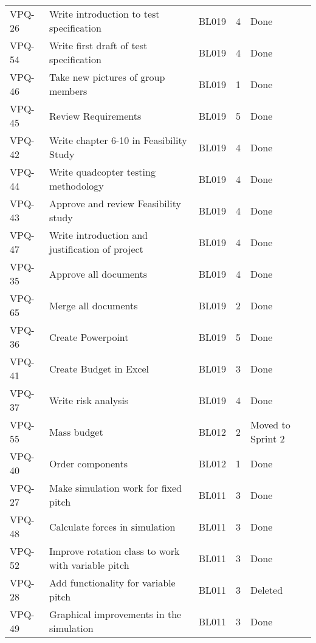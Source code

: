 \begin{table}[ht]
\begin{tabularx}{\linewidth}{|m{1.5cm} m{6.65cm} m{1.2cm} m{1.5cm} m{3.5cm}|}
              VPQ-26 & Write introduction to test specification & BL019  & 4\centering & Done  \\
\rowcolor{gainsboro}VPQ-54 & Write first draft of test specification & BL019 & 4\centering & Done  \\
            VPQ-46 & Take new pictures of group members & BL019 & 1\centering & Done  \\
\rowcolor{gainsboro} VPQ-45 & Review Requirements & BL019 & 5\centering & Done  \\
              VPQ-42 & Write chapter 6-10 in Feasibility Study & BL019 & 4\centering & Done  \\
\rowcolor{gainsboro} VPQ-44 & Write quadcopter testing methodology & BL019 & 4\centering & Done  \\    
            VPQ-43 & Approve and review Feasibility study & BL019 & 4\centering & Done  \\
\rowcolor{gainsboro}  VPQ-47 & Write introduction and justification of project & BL019 & 4\centering & Done  \\
            VPQ-35 & Approve all documents & BL019 & 4\centering & Done  \\
\rowcolor{gainsboro}  VPQ-65 & Merge all documents & BL019 & 2\centering & Done \\
            VPQ-36 & Create Powerpoint & BL019 & 5\centering & Done  \\
\rowcolor{gainsboro}  VPQ-41 & Create Budget in Excel & BL019 & 3\centering & Done  \\
            VPQ-37 & Write risk analysis & BL019 & 4\centering & Done  \\
\rowcolor{gainsboro}  VPQ-55 & Mass budget & BL012 & 2\centering & Moved to Sprint 2  \\
            VPQ-40 & Order components & BL012 & 1\centering & Done  \\
\rowcolor{gainsboro}  VPQ-27 & Make simulation work for fixed pitch & BL011 & 3\centering & Done  \\
            VPQ-48 & Calculate forces in simulation & BL011 & 3\centering & Done \\
\rowcolor{gainsboro}  VPQ-52 & Improve rotation class to work with variable pitch & BL011 & 3\centering & Done  \\
            VPQ-28 & Add functionality for variable pitch & BL011 & 3\centering & Deleted  \\
\rowcolor{gainsboro}  VPQ-49 & Graphical improvements in the simulation & BL011 & 3\centering & Done  \\

\end{tabularx}
\end{table}
